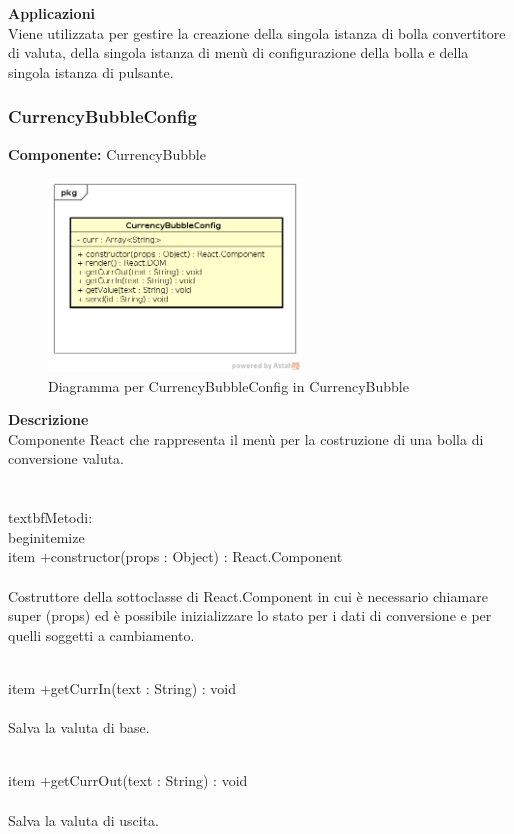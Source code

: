 \textbf{Applicazioni}\\
Viene utilizzata per gestire la creazione della singola istanza di bolla convertitore di valuta, della singola istanza di menù di configurazione della bolla e della singola istanza di pulsante. 


\clearpage

\subsubsection{CurrencyBubbleConfig}
\textbf{Componente:}  CurrencyBubble\\
   \FloatBarrier
   \begin{figure}[ht]
   \centering
   \includegraphics[width=0.6\textwidth]{img/single-CurrencyBubbleConfig}
   \caption{{Diagramma per CurrencyBubbleConfig in CurrencyBubble}}
\end{figure}
\FloatBarrier
\textbf{Descrizione}\\
Componente React che rappresenta il menù per la costruzione di una bolla di conversione valuta.
\\\\
\\textbf{Metodi:} 
\\begin{itemize}
\\item +constructor(props : Object) : React.Component 
\\\\
Costruttore della sottoclasse di React.Component in cui è necessario chiamare super (props) ed è possibile inizializzare lo stato per i dati di conversione e per quelli soggetti a cambiamento.

\\item +getCurrIn(text : String) : void 
\\\\
Salva la valuta di base.

\\item +getCurrOut(text : String) : void 
\\\\
Salva la valuta di uscita.

